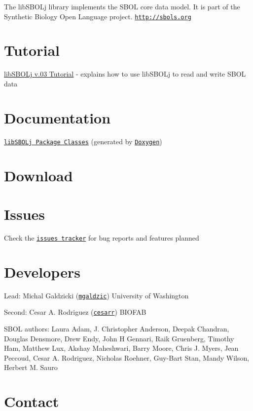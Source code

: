 The libSBOLj library implements the SBOL core data model. It is part of the Synthetic Biology Open Language project. \href{http://sbols.org}{\tt http://sbols.org} \hypertarget{index_tutorial_sec}{}\section{Tutorial}\label{index_tutorial_sec}

\begin{DoxyItemize}
\item \hyperlink{tutorial}{libSBOLj v.03 Tutorial} -\/ explains how to use libSBOLj to read and write SBOL data
\end{DoxyItemize}\hypertarget{index_doc_sec}{}\section{Documentation}\label{index_doc_sec}

\begin{DoxyItemize}
\item \href{annotated.html}{\tt libSBOLj Package Classes} (generated by \href{http://www.stack.nl/~dimitri/doxygen/}{\tt Doxygen})
\end{DoxyItemize}\hypertarget{index_download_sec}{}\section{Download}\label{index_download_sec}
\hypertarget{index_issues_sec}{}\section{Issues}\label{index_issues_sec}

\begin{DoxyItemize}
\item Check the \href{https://github.com/mgaldzic/libSBOLj/issues}{\tt issues tracker} for bug reports and features planned
\end{DoxyItemize}\hypertarget{index_author_sec}{}\section{Developers}\label{index_author_sec}

\begin{DoxyItemize}
\item Lead: Michal Galdzicki (\href{http://github.com/mgaldzic}{\tt mgaldzic}) University of Washington
\item Second: Cesar A. Rodriguez (\href{http://github.com/cesarr}{\tt cesarr}) BIOFAB
\item SBOL authors: Laura Adam, J. Christopher Anderson, Deepak Chandran, Douglas Densmore, Drew Endy, John H Gennari, Raik Gruenberg, Timothy Ham, Matthew Lux, Akshay Maheshwari, Barry Moore, Chris J. Myers, Jean Peccoud, Cesar A. Rodriguez, Nicholas Roehner, Guy-\/Bart Stan, Mandy Wilson, Herbert M. Sauro
\end{DoxyItemize}\hypertarget{index_contact_sec}{}\section{Contact}\label{index_contact_sec}

